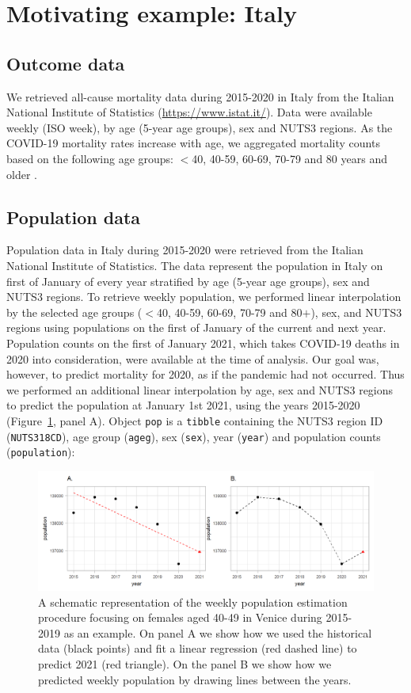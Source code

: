 \section{Motivating example: Italy}

\subsection{Outcome data}
We retrieved all-cause mortality data during 2015-2020 in Italy from the Italian National Institute of Statistics (\url{https://www.istat.it/}). Data were available weekly (ISO week), by age (5-year age groups), sex and NUTS3 regions. As the COVID-19 mortality rates increase with  age, we aggregated mortality counts based on the following age groups: $<$40, 40-59, 60-69, 70-79 and 80 years and older \citep{davies2021community}. 


\subsection{Population data}
Population data in Italy during 2015-2020 were retrieved from the Italian National Institute of Statistics. The data represent the population in Italy on first of January of every year stratified by age (5-year age groups), sex and NUTS3 regions. To retrieve weekly population, we performed linear interpolation by the selected age groups ($<$40, 40-59, 60-69, 70-79 and 80$+$), sex, and NUTS3 regions using populations on the first of January of the current and next year. Population counts on the first of January 2021, which takes COVID-19 deaths in 2020 into consideration, were available at the time of analysis. Our goal was, however, to predict mortality  for 2020, as if the pandemic had not occurred. Thus we performed an additional linear interpolation by age,  sex and NUTS3 regions to predict the population at January 1st 2021, using the years 2015-2020 (Figure~\ref{fig:popplot}, panel A). Object \texttt{pop} is a \texttt{tibble} containing the NUTS3 region ID (\texttt{NUTS318CD}), age group (\texttt{ageg}), sex (\texttt{sex}), year (\texttt{year}) and population counts (\texttt{population}):

\begin{figure}[!b]
	\centering
	\includegraphics{PopulationPlot.png}
	\caption{A schematic representation of the weekly population estimation procedure focusing on females aged 40-49 in Venice during 2015-2019 as an example. On panel A we show how we used the historical data (black points) and fit a linear regression (red dashed line) to predict 2021 (red triangle). On the panel B we show how we predicted weekly population by drawing lines between the years.}
	\label{fig:popplot}
\end{figure}

